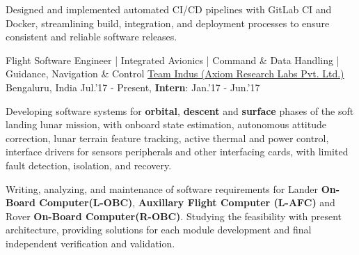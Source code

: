 \begin{cventries}
{\begin{cvitems}
		\item{\large Designed and implemented automated CI/CD pipelines with GitLab CI and Docker, streamlining build, integration, and deployment processes to ensure consistent and reliable software releases.}
		\end{cvitems}
	}
    \cventry
    {\large Flight Software Engineer | Integrated Avionics | Command \& Data Handling | Guidance, Navigation \& Control}
	{\href{http://www.teamindus.in/}{\large Team Indus (Axiom Research Labs Pvt. Ltd.)}}
	{\large Bengaluru, India}
	{\large Jul.'17 - Present, \textbf{Intern}: Jan.'17 - Jun.'17}
	{
		\begin{cvitems}
			\item{\large Developing software systems for \textbf{orbital}, \textbf{descent} and \textbf{surface} phases of the soft landing lunar mission, with onboard state estimation, autonomous attitude correction, lunar terrain feature tracking, active thermal and power control, interface drivers for sensors peripherals and other interfacing cards, with limited fault detection, isolation, and recovery.}
			\item{\large Writing, analyzing, and maintenance of software requirements for Lander \textbf{On-Board Computer(L-OBC)}, \textbf{Auxillary Flight Computer (L-AFC)} and Rover \textbf{On-Board Computer(R-OBC)}. Studying the feasibility with present architecture, providing solutions for each module development and final independent verification and validation.}

\end{cvitems}}
\end{cventries}
